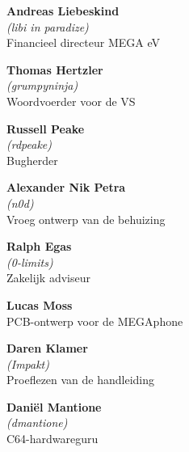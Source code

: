 \begin{mega65thanks}

\begin{minipage}{\linewidth}
  {\large\bf Andreas Liebeskind} \\
  \textit{(libi in paradize)} \\
  Financieel directeur MEGA eV
\end{minipage}

\begin{minipage}{\linewidth}
  {\large\bf Thomas Hertzler} \\
  \textit{(grumpyninja)} \\
  Woordvoerder voor de VS
\end{minipage}

\begin{minipage}{\linewidth}
  {\large\bf Russell Peake} \\
  \textit{(rdpeake)} \\
  Bugherder
\end{minipage}

\begin{minipage}{\linewidth}
  {\large\bf Alexander Nik Petra} \\
  \textit{(n0d)} \\
  Vroeg ontwerp van de behuizing
\end{minipage}

\begin{minipage}{\linewidth}
  {\large\bf Ralph Egas} \\
  \textit{(0-limits)} \\
  Zakelijk adviseur
\end{minipage}

\begin{minipage}{\linewidth}
  {\large\bf Lucas Moss} \\  PCB-ontwerp voor de MEGAphone
\end{minipage}

\begin{minipage}{\linewidth}
  {\large\bf Daren Klamer} \\
  \textit{(Impakt)} \\
  Proeflezen van de handleiding
\end{minipage}

\begin{minipage}{\linewidth}
  {\large\bf Daniël Mantione}  \\
  \textit{(dmantione)} \\
  C64-hardwareguru
\end{minipage}


\end{mega65thanks}
